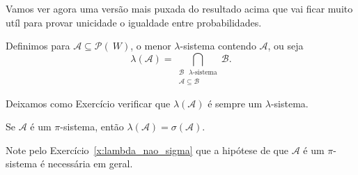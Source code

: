 \documentclass[../main/Notas_de_aula.tex]{subfiles}
\begin{document}
Vamos ver agora uma versão mais puxada do resultado acima que vai ficar muito utíl para provar unicidade o igualdade entre probabilidades.

\begin{definition}
Definimos para $\mathcal{A} \subseteq \mathcal{P}(~W)$, o menor $\lambda$-sistema contendo $\mathcal{A}$, ou seja
\begin{equation}
  \lambda(\mathcal{A}) = \bigcap_{\substack{\text{$\mathcal{B}$ $\lambda$-sistema}\\\mathcal{A} \subseteq \mathcal{B}}} \mathcal{B}.
\end{equation}
\end{definition}

Deixamos como Exercício verificar que $\lambda(\mathcal{A})$ é sempre um $\lambda$-sistema.

\begin{theorem}[Dynkin]
  \label{t:dynkin}
  Se $\mathcal{A}$ é um $\pi$-sistema, então $\lambda(\mathcal{A}) = \sigma(\mathcal{A})$.
\end{theorem}

Note pelo Exercício~\ref{x:lambda_nao_sigma} que a hipótese de que $\mathcal{A}$ é um $\pi$-sistema é necessária em geral.
\end{document}
